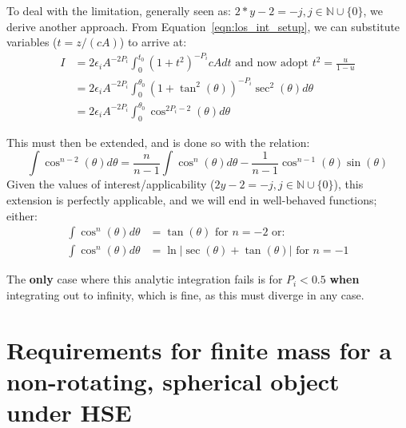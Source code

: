 \documentclass[twocolumn,traditabstract]{aa}
\begin{document}
To deal with the limitation, generally seen as: $2*y-2 = -j, j \in \mathbb{N} \cup \{0\}$, we derive another approach.
From Equation~\ref{eqn:los_int_setup}, we can substitute variables ($t = z / (cA)$) to arrive at:
\begin{align}
  I &= 2 \epsilon_i A^{-2P_i} \int_{0}^{t_0}(1+t^2)^{-P_i} c A dt \text{ and now adopt } t^2 = \frac{u}{1-u} \\
    &= 2 \epsilon_i A^{-2P_i} \int_{0}^{\theta_0}(1+\tan^2(\theta))^{-P_i} \sec^2(\theta) d\theta \\
    &= 2 \epsilon_i A^{-2P_i} \int_{0}^{\theta_0}\cos^{2P_i-2}(\theta) d\theta
\end{align}

This must then be extended, and is done so with the relation:
\begin{equation}
  \int \cos^{n-2}(\theta) d\theta = \frac{n}{n-1}\int \cos^n(\theta)d\theta - \frac{1}{n-1}\cos^{n-1}(\theta)\sin(\theta) 
  \label{eqn:cosext}
\end{equation}
Given the values of interest/applicability ($2y-2 = -j, j \in \mathbb{N} \cup \{0\}$), this extension is perfectly
applicable, and we will end in well-behaved functions; either:
\begin{align*}
  \int \cos^n(\theta)d\theta &= \tan(\theta) \text{ for } n=-2 \text{ or: } \\
  \int \cos^n(\theta)d\theta &= \ln \vert \sec(\theta) + \tan(\theta) \vert \text{ for } n=-1
\end{align*}

The \textbf{only} case where this analytic integration fails is for $P_i < 0.5$ \textbf{when} integrating out to infinity,
which is fine, as this must diverge in any case. 

\section{Requirements for finite mass for a non-rotating, spherical object under HSE}
\label{sec:finite_mass}
\end{document}
